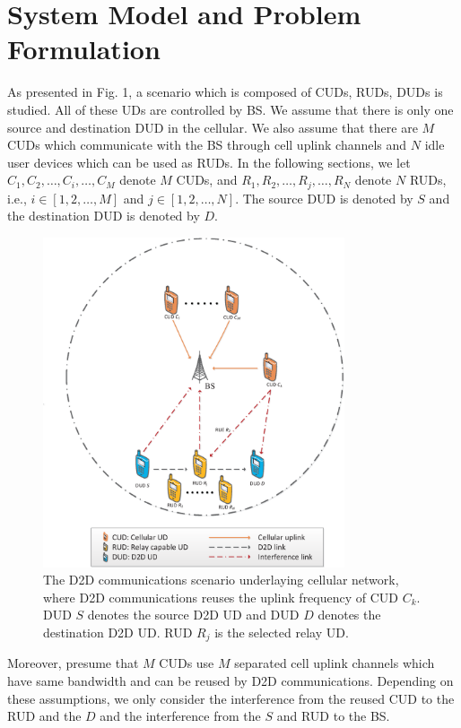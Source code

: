 \documentclass[conference]{IEEEtran}
\begin{document}
\section{System Model and Problem Formulation}
As presented in Fig. 1, a scenario which is composed of CUDs, RUDs, DUDs is studied. All of these UDs are controlled by BS. We assume that there is only one source and destination DUD in the cellular. We also assume that there are $M$ CUDs which communicate with the BS through cell uplink channels and $N$ idle user devices which can be used as RUDs. In the following sections, we let $C_{1},C_{2},\ldots,C_{i},\ldots,C_{M}$ denote $M$ CUDs, and $R_{1},R_{2},\ldots,R_{j},\ldots,R_{N}$ denote $N$ RUDs, i.e., $i\in\left[1,2,\ldots,M\right]$ and $j\in\left[1,2,\ldots,N\right]$. The source DUD is denoted by $S$ and the destination DUD is denoted by $D$.
\begin{figure}[!t]
\center
\includegraphics[width=3.5in]{fig1}
\caption{The D2D communications scenario underlaying cellular network, where D2D communications reuses the uplink frequency of CUD $C_k$. DUD $S$ denotes the source D2D UD and DUD $D$ denotes the destination D2D UD. RUD $R_j$ is the selected relay UD.}
\label{fig_success}
\end{figure}

Moreover, presume that $M$ CUDs use $M$ separated cell uplink channels which have same bandwidth and can be reused by D2D communications. Depending on these assumptions, we only consider the interference from the reused CUD to the RUD and the $D$ and the interference from the $S$ and RUD to the BS.
\end{document}
